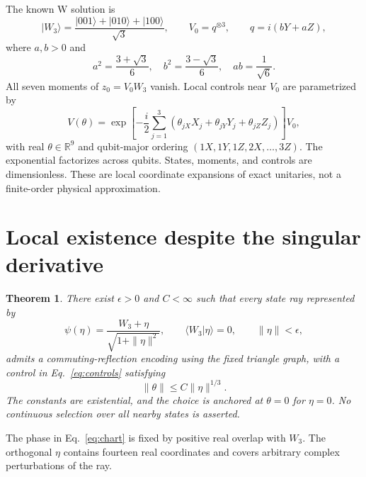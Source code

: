 \documentclass[11pt]{article}
\newcommand{\ket}[1]{\lvert #1\rangle}
\newcommand{\bra}[1]{\langle #1\rvert}
\newcommand{\W}{W_3}
\newtheorem{theorem}{Theorem}
\begin{document}
The known W solution \cite[Proposition 7]{Pauwels2026} is
\begin{equation}
\ket\W=\frac{\ket{001}+\ket{010}+\ket{100}}{\sqrt3},\qquad
V_0=q^{\otimes3},\qquad q=i(bY+aZ),
\end{equation}
where $a,b>0$ and
\begin{equation}
a^2=\frac{3+\sqrt3}{6},\quad b^2=\frac{3-\sqrt3}{6},\quad ab=\frac1{\sqrt6}.
\end{equation}
All seven moments of $z_0=V_0\W$ vanish. Local controls near $V_0$ are parametrized by
\begin{equation}
V(\theta)=\exp\!\left[-\frac i2\sum_{j=1}^3
\left(\theta_{jX}X_j+\theta_{jY}Y_j+\theta_{jZ}Z_j\right)\right]V_0,
\label{eq:controls}
\end{equation}
with real $\theta\in\mathbb R^9$ and qubit-major ordering $(1X,1Y,1Z,2X,\ldots,3Z)$. The exponential factorizes across qubits. States, moments, and controls are dimensionless. These are local coordinate expansions of exact unitaries, not a finite-order physical approximation.

\section{Local existence despite the singular derivative}
\begin{theorem}\label{thm:local}
There exist $\epsilon>0$ and $C<\infty$ such that every state ray represented by
\begin{equation}
\psi(\eta)=\frac{\W+\eta}{\sqrt{1+\|\eta\|^2}},\qquad
\bra\W\eta\rangle=0,\qquad \|\eta\|<\epsilon,
\label{eq:chart}
\end{equation}
admits a commuting-reflection encoding using the fixed triangle graph, with a control in Eq.~\eqref{eq:controls} satisfying
\begin{equation}
\|\theta\|\le C\|\eta\|^{1/3}.
\label{eq:bound}
\end{equation}
The constants are existential, and the choice is anchored at $\theta=0$ for $\eta=0$. No continuous selection over all nearby states is asserted.
\end{theorem}

The phase in Eq.~\eqref{eq:chart} is fixed by positive real overlap with $\W$. The orthogonal $\eta$ contains fourteen real coordinates and covers arbitrary complex perturbations of the ray.
\end{document}
